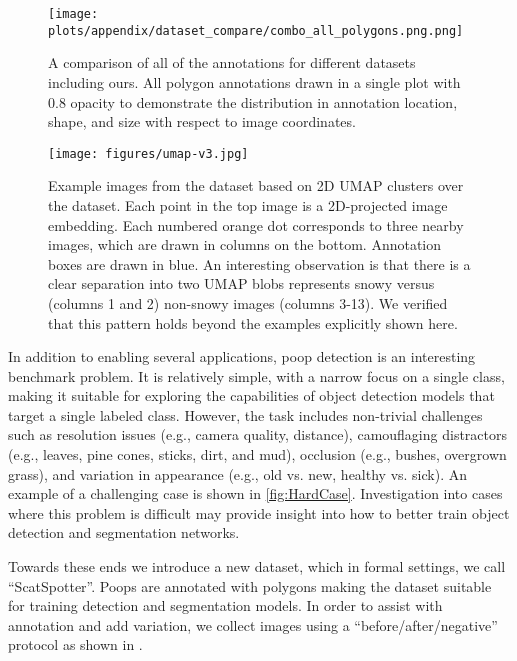 \documentclass[10pt,twocolumn,letterpaper]{article}
\begin{document}
\begin{figure*}[t]
\centering
\texttt{[image: plots/appendix/dataset\_compare/combo\_all\_polygons.png.png]}
\caption[]{
    A comparison of all of the annotations for different datasets including ours.
    All polygon annotations drawn in a single plot with $0.8$ opacity to
    demonstrate the distribution in annotation location, shape, and size with
    respect to image coordinates.
}
\label{fig:compare_allannots}
\end{figure*}

\begin{figure*}[t]
\centering
\texttt{[image: figures/umap-v3.jpg]}%
\caption[]{
    Example images from the dataset based on 2D UMAP \cite{mcinnes_umap_2020} clusters over the dataset.
    Each point in the top image is a 2D-projected image embedding. Each
    numbered orange dot corresponds to three nearby images, which are drawn in columns on the bottom.
    Annotation boxes are drawn in blue.
    An interesting observation is that there is a clear separation into two UMAP blobs represents snowy versus (columns 1 and 2)
      non-snowy images (columns 3-13). We verified that this pattern holds beyond the examples explicitly shown here.
}
\label{fig:umap_dataset_viz}
\end{figure*}


In addition to enabling several applications, poop detection is an interesting benchmark problem.
It is relatively simple, with a narrow focus on a single class, making it suitable for exploring the
  capabilities of object detection models that target a single labeled class.
However, the task includes non-trivial challenges such as resolution issues (e.g., camera quality,
  distance), camouflaging distractors (e.g., leaves, pine cones, sticks, dirt, and mud), occlusion (e.g., bushes, overgrown
  grass), and variation in appearance (e.g., old vs. new, healthy vs. sick).
An example of a challenging case is shown in \cref{fig:HardCase}.
Investigation into cases where this problem is difficult may provide insight
into how to better train object detection and segmentation networks.

Towards these ends we introduce a new dataset, which 
in formal settings, we call ``ScatSpotter''.
Poops are annotated with polygons making the dataset suitable for training detection and segmentation
  models.
In order to assist with annotation and add variation, we collect images using a ``before/after/negative''
  protocol as shown in .
\end{document}
